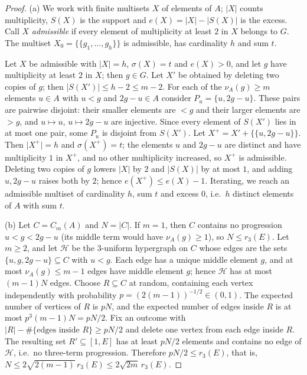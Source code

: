 \documentclass[11pt,reqno]{amsart}
\numberwithin{equation}{section}
\theoremstyle{definition}
\theoremstyle{remark}
\newcommand{\card}[1]{\lvert #1\rvert}
\begin{document}
\begin{proof}
(a) We work with finite multisets $X$ of elements of $A$; $\card X$ counts multiplicity, $S(X)$ is the support and $e(X)=\card X-\card{S(X)}$ is the excess. Call $X$ \emph{admissible} if every element of multiplicity at least $2$ in $X$ belongs to $G$. The multiset $X_0=\{\!\{g_1,\dots,g_h\}\!\}$ is admissible, has cardinality $h$ and sum $t$.

Let $X$ be admissible with $\card X=h$, $\sigma(X)=t$ and $e(X)>0$, and let $g$ have multiplicity at least $2$ in $X$; then $g\in G$. Let $X'$ be obtained by deleting two copies of $g$; then $\card{S(X')}\le h-2\le m-2$. For each of the $\nu_A(g)\ge m$ elements $u\in A$ with $u<g$ and $2g-u\in A$ consider $P_u=\{u,2g-u\}$. These pairs are pairwise disjoint: their smaller elements are $<g$ and their larger elements are $>g$, and $u\mapsto u$, $u\mapsto2g-u$ are injective. Since every element of $S(X')$ lies in at most one pair, some $P_u$ is disjoint from $S(X')$. Let $X^+=X'+\{\!\{u,2g-u\}\!\}$. Then $\card{X^+}=h$ and $\sigma(X^+)=t$; the elements $u$ and $2g-u$ are distinct and have multiplicity $1$ in $X^+$, and no other multiplicity increased, so $X^+$ is admissible. Deleting two copies of $g$ lowers $\card X$ by $2$ and $\card{S(X)}$ by at most $1$, and adding $u,2g-u$ raises both by $2$; hence $e(X^+)\le e(X)-1$. Iterating, we reach an admissible multiset of cardinality $h$, sum $t$ and excess $0$, i.e.\ $h$ distinct elements of $A$ with sum $t$.

(b) Let $C=C_m(A)$ and $N=\card C$. If $m=1$, then $C$ contains no progression $u<g<2g-u$ (its middle term would have $\nu_A(g)\ge1$), so $N\le r_3(E)$. Let $m\ge2$, and let $\mathcal H$ be the $3$-uniform hypergraph on $C$ whose edges are the sets $\{u,g,2g-u\}\subseteq C$ with $u<g$. Each edge has a unique middle element $g$, and at most $\nu_A(g)\le m-1$ edges have middle element $g$; hence $\mathcal H$ has at most $(m-1)N$ edges. Choose $R\subseteq C$ at random, containing each vertex independently with probability $p=(2(m-1))^{-1/2}\in(0,1)$. The expected number of vertices of $R$ is $pN$, and the expected number of edges inside $R$ is at most $p^3(m-1)N=pN/2$. Fix an outcome with $\card R-\#\{\text{edges inside }R\}\ge pN/2$ and delete one vertex from each edge inside $R$. The resulting set $R'\subseteq[1,E]$ has at least $pN/2$ elements and contains no edge of $\mathcal H$, i.e.\ no three-term progression. Therefore $pN/2\le r_3(E)$, that is, $N\le2\sqrt{2(m-1)}\,r_3(E)\le2\sqrt{2m}\,r_3(E)$.
\end{proof}
\end{document}
